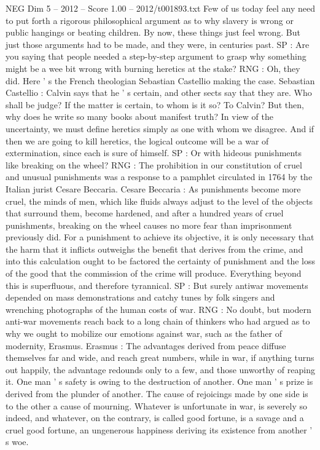 \begin{textsample}{NEG Dim 5 – 2012 – Score 1.00 – 2012/t001893.txt}
Few of us today feel any need to put forth a rigorous philosophical argument as to why slavery is wrong or public hangings or beating children.
By now, these things just feel wrong.
But just those arguments had to be made, and they were, in centuries past.
SP : Are you saying that people needed a step-by-step argument to grasp why something might be a wee bit wrong with burning heretics at the stake?
RNG : Oh, they did.
Here ' s the French theologian Sebastian Castellio making the case.
Sebastian Castellio : Calvin says that he ' s certain, and other sects say that they are.
Who shall be judge?
If the matter is certain, to whom is it so?
To Calvin?
But then, why does he write so many books about manifest truth?
In view of the uncertainty, we must define heretics simply as one with whom we disagree.
And if then we are going to kill heretics, the logical outcome will be a war of extermination, since each is sure of himself.
SP : Or with hideous punishments like breaking on the wheel?
RNG : The prohibition in our constitution of cruel and unusual punishments was a response to a pamphlet circulated in 1764 by the Italian jurist Cesare Beccaria.
Cesare Beccaria : As punishments become more cruel, the minds of men, which like fluids always adjust to the level of the objects that surround them, become hardened, and after a hundred years of cruel punishments, breaking on the wheel causes no more fear than imprisonment previously did.
For a punishment to achieve its objective, it is only necessary that the harm that it inflicts outweighs the benefit that derives from the crime, and into this calculation ought to be factored the certainty of punishment and the loss of the good that the commission of the crime will produce.
Everything beyond this is superfluous, and therefore tyrannical.
SP : But surely antiwar movements depended on mass demonstrations and catchy tunes by folk singers and wrenching photographs of the human costs of war.
RNG : No doubt, but modern anti-war movements reach back to a long chain of thinkers who had argued as to why we ought to mobilize our emotions against war, such as the father of modernity, Erasmus.
Erasmus : The advantages derived from peace diffuse themselves far and wide, and reach great numbers, while in war, if anything turns out happily, the advantage redounds only to a few, and those unworthy of reaping it.
One man ' s safety is owing to the destruction of another.
One man ' s prize is derived from the plunder of another.
The cause of rejoicings made by one side is to the other a cause of mourning.
Whatever is unfortunate in war, is severely so indeed, and whatever, on the contrary, is called good fortune, is a savage and a cruel good fortune, an ungenerous happiness deriving its existence from another ' s woe.

\end{textsample}
